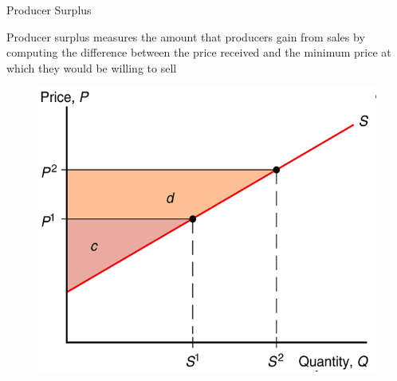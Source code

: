 \documentclass[10pt,hyperref={CJKbookmarks=true},xcolor=dvipsnames,aspectratio=169]{beamer}
\begin{document}
\begin{frame}{Producer Surplus}

\begin{block}{Producer surplus measures the amount that producers gain from sales
by computing the difference between the price received and the minimum
price at which they would be willing to sell}


\begin{figure}


\includegraphics[scale=0.3]{fig/instruments/lec07-9}

\end{figure}

\end{block}
\end{frame}
\end{document}
